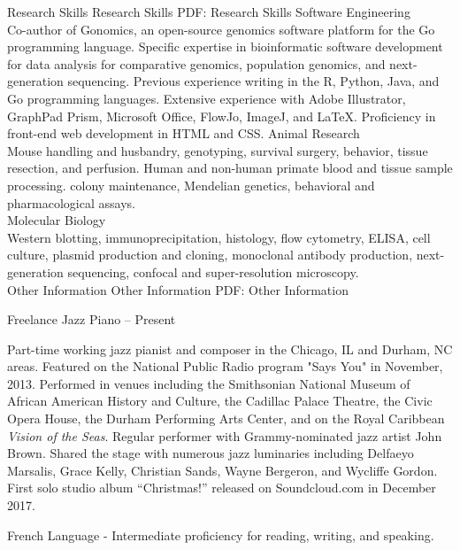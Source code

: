 \documentclass[letterpaper,MMMyyyy,nonstopmode]{simpleresumecv}
\begin{document}
\begin{Body}
\Section
{Research Skills}
{Research Skills}
{PDF: Research Skills}
\BulletItem
Software Engineering\\
Co-author of Gonomics, an open-source genomics software platform for the Go programming language. Specific expertise 
in bioinformatic software development for data analysis for comparative genomics, population genomics, and next-generation 
sequencing. Previous experience writing in the R, Python, Java, and Go programming languages. Extensive experience
with Adobe Illustrator, GraphPad Prism, Microsoft Office, FlowJo, ImageJ, and {\LaTeX}. Proficiency in front-end web 
development in HTML and CSS.
\BulletItem
Animal Research\\
Mouse handling and husbandry, genotyping, survival surgery, behavior, tissue resection, and perfusion. 
Human and non-human primate blood and tissue sample processing.  colony maintenance, 
Mendelian genetics, behavioral and pharmacological assays. \\
\BulletItem
Molecular Biology\\
Western blotting, immunoprecipitation, histology, flow cytometry, ELISA, cell culture, plasmid production and cloning, 
monoclonal antibody production, next-generation sequencing, confocal and super-resolution microscopy.\\


\Section
{Other Information}
{Other Information}
{PDF: Other Information}

\Gap
\BulletItem
Freelance Jazz Piano \hfill{-- Present}
\begin{Detail}
\SubBulletItem
Part-time working jazz pianist and composer in the Chicago, IL and Durham, NC areas. 
\SubBulletItem
Featured on the National Public Radio program "Says You" in November, 2013. 
\SubBulletItem
Performed in venues including the Smithsonian National Museum of African American History and Culture, the Cadillac Palace Theatre, the Civic Opera House, the Durham Performing Arts Center, and on the Royal Caribbean \textit{Vision of the Seas}.
\SubBulletItem
Regular performer with Grammy-nominated jazz artist John Brown. Shared the stage with numerous jazz luminaries including Delfaeyo Marsalis, Grace Kelly, Christian Sands, Wayne Bergeron, and Wycliffe Gordon.
\SubBulletItem
First solo studio album “Christmas!” released on Soundcloud.com in December 2017. 
\end{Detail}
\Gap
\BulletItem
French Language - Intermediate proficiency for reading, writing, and speaking.


\end{Body}
\end{document}
